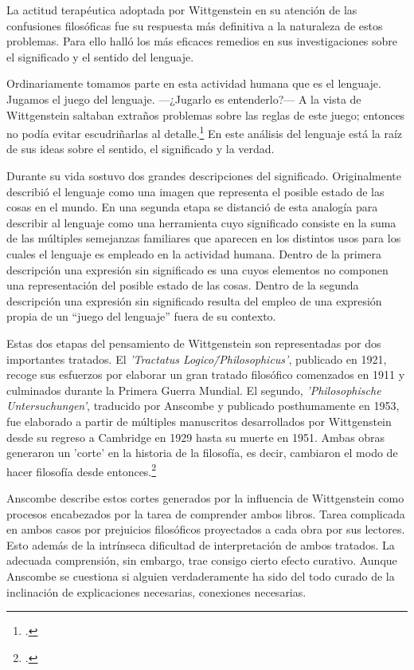   La actitud terapéutica adoptada por Wittgenstein en su atención de las
  confusiones filosóficas fue su respuesta más definitiva a la naturaleza de estos
  problemas. Para ello halló los más eficaces remedios en sus investigaciones
  sobre el significado y el sentido del lenguaje.

  Ordinariamente tomamos parte en esta actividad humana que es el lenguaje.
  Jugamos el juego del lenguaje. ---¿Jugarlo es entenderlo?--- A la vista de
  Wittgenstein saltaban extraños problemas sobre las reglas de este juego;
  entonces no podía evitar escudriñarlas al
  detalle.\footcite[cf.~][loc.7099]{monk} En este análisis del lenguaje está la
  raíz de sus ideas sobre el sentido, el significado y la verdad.

  Durante su vida sostuvo dos grandes descripciones del significado. Originalmente
  describió el lenguaje como una imagen que representa el posible estado de las
  cosas en el mundo. En una segunda etapa se distanció de esta analogía para
  describir al lenguaje como una herramienta cuyo significado consiste en la suma
  de las múltiples semejanzas familiares que aparecen en los distintos usos para
  los cuales el lenguaje es empleado en la actividad humana. Dentro de la primera
  descripción una expresión sin significado es una cuyos elementos no componen una
  representación del posible estado de las cosas. Dentro de la segunda descripción
  una expresión sin significado resulta del empleo de una expresión propia de un
  ``juego del lenguaje'' fuera de su contexto.

  Estas dos etapas del pensamiento de Wittgenstein son representadas por dos
  importantes tratados. El \emph{'Tractatus Logico\=/Philosophicus'}, publicado en
  1921, recoge sus esfuerzos por elaborar un gran tratado filosófico comenzados en
  1911 y culminados durante la Primera Guerra Mundial. El segundo,
  \emph{'Philosophische Untersuchungen'}, traducido por Anscombe y publicado
  posthumamente en 1953, fue elaborado a partir de múltiples manuscritos
  desarrollados por Wittgenstein desde su regreso a Cambridge en 1929 hasta su
  muerte en 1951. Ambas obras generaron un 'corte' en la historia de la filosofía,
  es decir, cambiaron el modo de hacer filosofía desde
  entonces.\footcite[cf.~][p.~181]{twocuts}

  Anscombe describe estos cortes generados por la influencia de Wittgenstein
  como procesos encabezados por la tarea de comprender ambos libros. Tarea
  complicada en ambos casos por prejuicios filosóficos proyectados a cada obra
  por sus lectores. Esto además de la intrínseca dificultad de interpretación de
  ambos tratados. La adecuada comprensión, sin embargo, trae consigo cierto
  efecto curativo. Aunque Anscombe se cuestiona si alguien verdaderamente ha sido del todo curado de la inclinación de explicaciones necesarias, conexiones necesarias.

